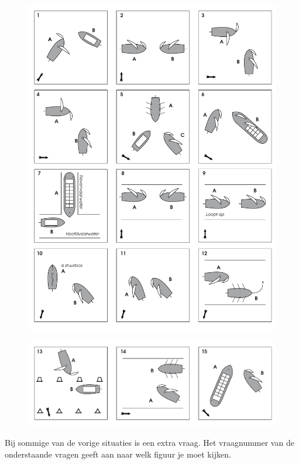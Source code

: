 \begin{figure}[h!]
    \centering
    \includegraphics[width=\textwidth]{Hoofdstukken/Oefenvragen/pdf/regelementen_1.pdf}
\end{figure}

\newpage
\begin{figure}[h!]
    \centering
    \includegraphics[width=\textwidth]{Hoofdstukken/Oefenvragen/pdf/regelementen_2.pdf}
\end{figure}
Bij sommige van de vorige situaties is een extra vraag. Het vraagnummer van de onderstaande vragen geeft aan naar welk figuur je moet kijken.\vspace{2cm}


